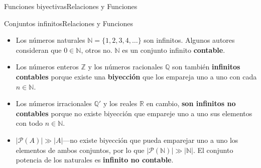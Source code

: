 \documentclass[spanish, c]{beamer}
\begin{document}
\begin{frame}{Funciones biyectivas}{Relaciones y Funciones}
    \begin{center}
    \end{center}
\end{frame}

\begin{frame}{Conjuntos infinitos}{Relaciones y Funciones}
    \begin{itemize}
        \justifying
        \itemsep1.5em
        \item <1-> Los números \alert{naturales} $\mathbb{N} = \{1, 2, 3, 4, \dots\}$ son infinitos. Algunos autores consideran que $0 \in \mathbb{N}$, otros no. $\mathbb{N}$ es un conjunto infinito \textbf{contable}.
        \item <2-> Los números \alert{enteros} $\mathbb{Z}$ y los números \alert{racionales} $\mathbb{Q}$ son también \textbf{infinitos contables} porque existe una \textbf{biyección} que los empareja uno a uno con cada $n \in \mathbb{N}$.
        \item <3-> Los números \alert{irracionales} $\mathbb{Q}'$ y los \alert{reales} $\mathbb{R}$ en cambio, \textbf{son infinitos no contables} porque no existe biyección que empareje uno a uno sus elementos con todo $n \in \mathbb{N}$.
        \item <4-> $|\mathscr{P}(A)| \gg |A|$---no existe biyección que pueda emparejar uno a uno los elementos de ambos conjuntos, por lo que $|\mathscr{P}(\mathbb{N})| \gg |\mathbb{N}|$. El conjunto potencia de los naturales es \textbf{infinito no contable}.
    \end{itemize}
\end{frame}
\end{document}
